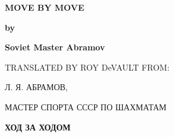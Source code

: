 \begin{titlepage}
\Centering

{\Huge\bfseries\sffamily MOVE BY MOVE \par}

\vspace{.75in}

{\LARGE\sffamily\bfseries by \par}

\vspace{.75in}

{\LARGE\sffamily\bfseries Soviet Master Abramov \par}

\vspace{10cm}


{\large\ttfamily TRANSLATED BY ROY DeVAULT FROM: \par}

\vspace{.5in}
{\large Л. Я. АБРАМОВ, \par}

{\small МАСТЕР СПОРТА СССР ПО ШАХМАТАМ}

\vfill

{\Large\sffamily\bfseries ХОД ЗА ХОДОМ}

\end{titlepage}
